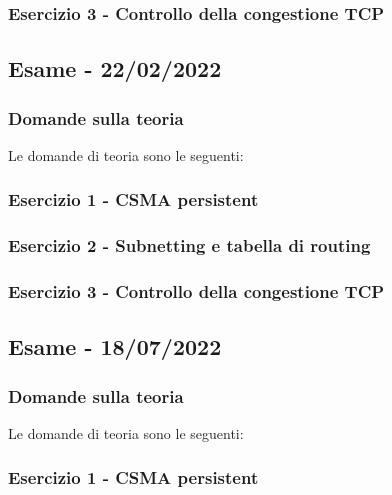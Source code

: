 \documentclass[a4paper]{article}
\begin{document}
	\subsubsection{Esercizio 3 - Controllo della congestione TCP}
	
	\newpage

	\subsection[\textbf{Esame - 22/02/2022}]{Esame - 22/02/2022}
	
	\subsubsection{Domande sulla teoria}
	Le domande di teoria sono le seguenti:
	
	\subsubsection{Esercizio 1 - CSMA persistent}
	
	\subsubsection{Esercizio 2 - Subnetting e tabella di routing}
	
	\subsubsection{Esercizio 3 - Controllo della congestione TCP}
	
	\newpage

	\subsection[\textbf{Esame - 18/07/2022}]{Esame - 18/07/2022}
	
	\subsubsection{Domande sulla teoria}
	Le domande di teoria sono le seguenti:
	
	\subsubsection{Esercizio 1 - CSMA persistent}
	
\end{document}

